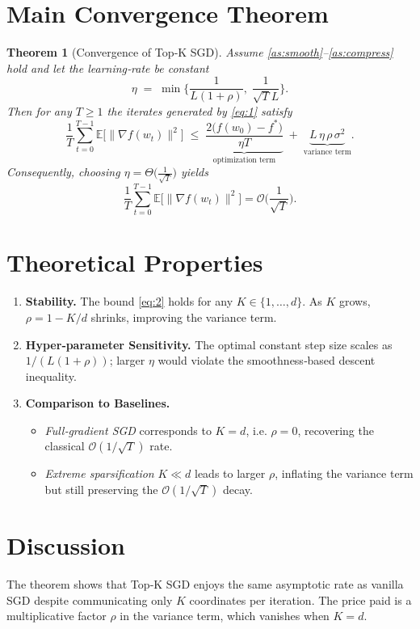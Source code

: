 \documentclass{article}
\newtheorem{theorem}{Theorem}
\begin{document}
\section*{Main Convergence Theorem}
\begin{theorem}[Convergence of Top‑K SGD]\label{thm:main}
Assume \ref{as:smooth}–\ref{as:compress} hold and let the learning‑rate be constant
\[
\eta\;=\;\min\Big\{\frac{1}{L(1+\rho)},\;\frac{1}{\sqrt{T}L}\Big\}.
\]
Then for any $T\ge 1$ the iterates generated by \eqref{eq:1} satisfy
\[
\frac{1}{T}\sum_{t=0}^{T-1}\mathbb{E}\big[\|\nabla f(w_t)\|^{2}\big]
\;\le\;
\underbrace{\frac{2\big(f(w_0)-f^{*}\big)}{\eta T}}_{\text{optimization term}}
\;+\;
\underbrace{L\,\eta\,\rho\,\sigma^{2}}_{\text{variance term}}.
\tag{2}
\]
Consequently, choosing $\eta = \Theta\!\big(\frac{1}{\sqrt{T}}\big)$ yields
\[
\frac{1}{T}\sum_{t=0}^{T-1}\mathbb{E}\big[\|\nabla f(w_t)\|^{2}\big]=\mathcal{O}\!\Big(\frac{1}{\sqrt{T}}\Big).
\]
\end{theorem}

\section*{Theoretical Properties}
\begin{enumerate}[label=\arabic*.]
\item \textbf{Stability.} The bound \eqref{eq:2} holds for any $K\in\{1,\dots,d\}$.  As $K$ grows, $\rho=1-K/d$ shrinks, improving the variance term.
\item \textbf{Hyper‑parameter Sensitivity.} The optimal constant step size scales as $1/(L(1+\rho))$; larger $\eta$ would violate the smoothness‑based descent inequality.
\item \textbf{Comparison to Baselines.}
    \begin{itemize}
        \item \emph{Full‑gradient SGD} corresponds to $K=d$, i.e. $\rho=0$, recovering the classical $\mathcal{O}(1/\sqrt{T})$ rate.
        \item \emph{Extreme sparsification} $K\ll d$ leads to larger $\rho$, inflating the variance term but still preserving the $\mathcal{O}(1/\sqrt{T})$ decay.
    \end{itemize}
\end{enumerate}

\section*{Discussion}
The theorem shows that Top‑K SGD enjoys the same asymptotic rate as vanilla SGD despite communicating only $K$ coordinates per iteration.  The price paid is a multiplicative factor $\rho$ in the variance term, which vanishes when $K=d$.
\end{document}
